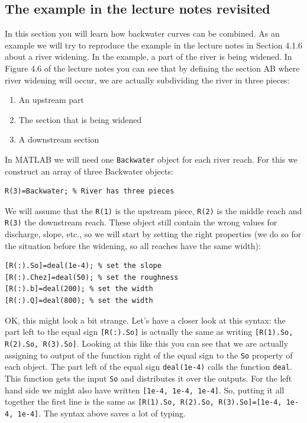 \documentclass[a4paper]{article}
\begin{document}
\subsection{The example in the lecture notes revisited}
\label{sec:combining_backwaters}
In this section you will learn how backwater curves can be combined. As an example we will try to reproduce the example in the lecture notes in Section 4.1.6 about a river widening. In the example, a part of the river is being widened. In Figure 4.6 of the lecture notes you can see that by defining the section AB where river widening will occur, we are actually subdividing the river in three pieces:
\begin{enumerate}
  \item An upstream part
  \item The section that is being widened
  \item A downstream section
\end{enumerate}
In MATLAB we will need one \lstinline{Backwater} object for each river reach.
For this we construct an array of three Backwater objects:
\begin{lstlisting}
R(3)=Backwater; % River has three pieces
\end{lstlisting}
We will assume that the \lstinline{R(1)} is the upstream piece, \lstinline{R(2)} is the middle reach and \lstinline{R(3)} the downstream reach.
These object still contain the wrong values for discharge, slope, etc., so we will start by setting the right properties (we do so for the situation before the widening, so all reaches have the same width):
\begin{lstlisting}
[R(:).So]=deal(1e-4); % set the slope
[R(:).Chez]=deal(50); % set the roughness
[R(:).b]=deal(200); % set the width
[R(:).Q]=deal(800); % set the width
\end{lstlisting}
OK, this might look a bit strange. Let's have a closer look at this syntax: the part left to the equal sign \lstinline{[R(:).So]} is actually the same as writing \lstinline{[R(1).So, R(2).So, R(3).So]}. Looking at this like this you can see that we are actually assigning to output of the function right of the equal sign to the \lstinline{So} property of each object. The part left of the equal sign \lstinline{deal(1e-4)} calls the function \lstinline{deal}. This function gets the input \lstinline{So} and distributes it over the outputs. For the left hand side we might also have written \lstinline{[1e-4, 1e-4, 1e-4]}. So, putting it all together the first line is the same as \lstinline{[R(1).So, R(2).So, R(3).So]=[1e-4, 1e-4, 1e-4]}. The syntax above saves a lot of typing.
\end{document}
